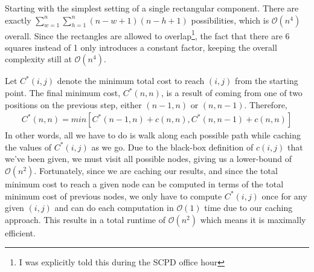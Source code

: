 \documentclass[11pt]{article}
\newcommand\p{\Needspace{10\baselineskip} \noindent}
\begin{document}
Starting with the simplest setting of a single rectangular component. There are exactly $\sum_{w=1}^n\sum_{h=1}^n (n - w + 1) (n - h + 1)$ possibilities, which is $\mathcal O (n^4)$ overall. Since the rectangles are allowed to overlap\footnote{I was explicitly told this during the SCPD office hour}, the fact that there are 6 squares instead of 1 only introduces a constant factor, keeping the overall complexity still at $\mathcal{O}(n^4)$. 

\clearpage
\p {} 

Let $C^*(i, j)$ denote the minimum total cost to reach $(i, j)$ from the starting point. The final minimum cost, $C^*(n, n)$, is a result of coming from one of two positions on the previous step, either $(n - 1, n)$ or $(n, n - 1)$. Therefore,  
\begin{align}
	C^*(n, n) = min\left[
		C^*(n - 1, n) + c(n, n),
		C^*(n, n - 1) + c(n, n)
	\right]
\end{align}
In other words, all we have to do is walk along each possible path while caching the values of $C^*(i, j)$ as we go. Due to the black-box definition of $c(i, j)$ that we've been given, we must visit all possible nodes, giving us a lower-bound of $\mathcal{O}(n^2)$. Fortunately, since we are caching our results, and since the total minimum cost to reach a given node can be computed in terms of the total minimum cost of previous nodes, we only have to compute $C^*(i, j)$ once for any given $(i, j)$ and can do each computation in $\mathcal{O}(1)$ time due to our caching approach.  This results in a total runtime of $\mathcal{O}(n^2)$ which means it is maximally efficient. 

\clearpage
\p {} 
\end{document}
